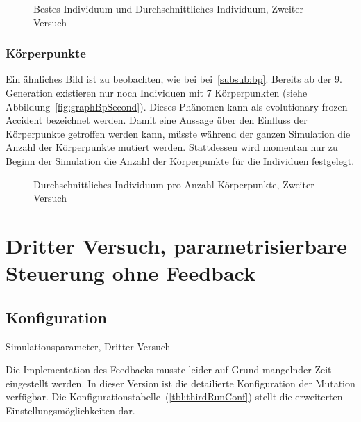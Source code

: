       \begin{figure}
        \centering
        
        \caption{Bestes Individuum und Durchschnittliches Individuum, Zweiter Versuch\label{fig:graphSecond}}
      \end{figure}

      \subsubsection{Körperpunkte\label{subsub:bpScnd}}

        Ein ähnliches Bild ist zu beobachten, wie bei bei~\vref{subsub:bp}.
        Bereits ab der 9\@. Generation existieren nur noch Individuen mit 7 Körperpunkten (siehe Abbildung~\vref{fig:graphBpSecond}).
        Dieses Phänomen kann als evolutionary frozen Accident bezeichnet werden.
        Damit eine Aussage über den Einfluss der Körperpunkte getroffen werden kann,
        müsste während der ganzen Simulation die Anzahl der Körperpunkte mutiert werden.
        Stattdessen wird momentan nur zu Beginn der Simulation die Anzahl der Körperpunkte für die Individuen festgelegt.

        \begin{figure}
          \centering
          
          \caption{Durchschnittliches Individuum pro Anzahl Körperpunkte, Zweiter Versuch\label{fig:graphBpSecond}}
        \end{figure}

    \section{Dritter Versuch, parametrisierbare Steuerung ohne Feedback}

      \subsection{Konfiguration}

        \begin{table}[H]
          \centering
          
          \caption{Simulationsparameter, Dritter Versuch \label{tbl:thirdRunConf}}
        \end{table}

        Die Implementation des Feedbacks musste leider auf Grund mangelnder Zeit eingestellt werden.
        In dieser Version ist die detailierte Konfiguration der Mutation verfügbar.
        Die Konfigurationstabelle~(\vref{tbl:thirdRunConf}) stellt die erweiterten Einstellungsmöglichkeiten dar.



